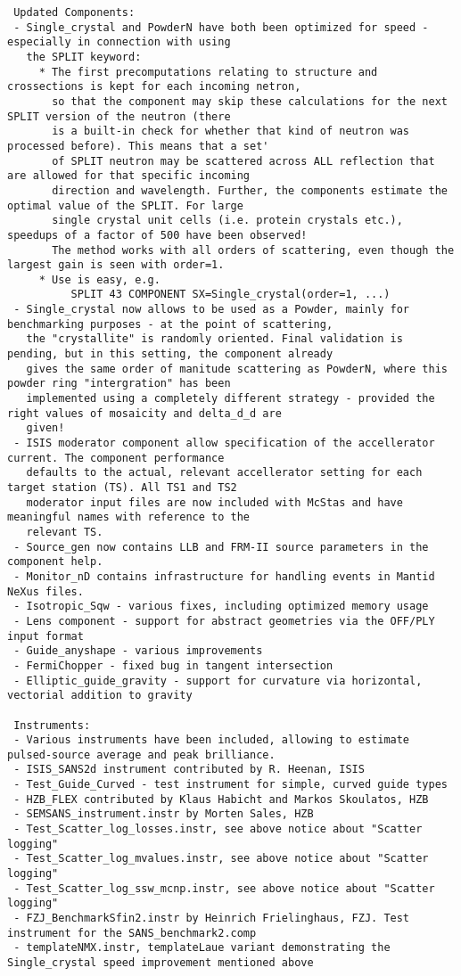 \begin{lstlisting}
 Updated Components:
 - Single_crystal and PowderN have both been optimized for speed - especially in connection with using
   the SPLIT keyword:
     * The first precomputations relating to structure and crossections is kept for each incoming netron,
       so that the component may skip these calculations for the next SPLIT version of the neutron (there
       is a built-in check for whether that kind of neutron was processed before). This means that a set'
       of SPLIT neutron may be scattered across ALL reflection that are allowed for that specific incoming
       direction and wavelength. Further, the components estimate the optimal value of the SPLIT. For large
       single crystal unit cells (i.e. protein crystals etc.), speedups of a factor of 500 have been observed!
       The method works with all orders of scattering, even though the largest gain is seen with order=1.
     * Use is easy, e.g.
          SPLIT 43 COMPONENT SX=Single_crystal(order=1, ...)
 - Single_crystal now allows to be used as a Powder, mainly for benchmarking purposes - at the point of scattering,
   the "crystallite" is randomly oriented. Final validation is pending, but in this setting, the component already
   gives the same order of manitude scattering as PowderN, where this powder ring "intergration" has been 
   implemented using a completely different strategy - provided the right values of mosaicity and delta_d_d are
   given!
 - ISIS moderator component allow specification of the accellerator current. The component performance
   defaults to the actual, relevant accellerator setting for each target station (TS). All TS1 and TS2
   moderator input files are now included with McStas and have meaningful names with reference to the 
   relevant TS. 
 - Source_gen now contains LLB and FRM-II source parameters in the component help.
 - Monitor_nD contains infrastructure for handling events in Mantid NeXus files.
 - Isotropic_Sqw - various fixes, including optimized memory usage
 - Lens component - support for abstract geometries via the OFF/PLY input format
 - Guide_anyshape - various improvements
 - FermiChopper - fixed bug in tangent intersection
 - Elliptic_guide_gravity - support for curvature via horizontal, vectorial addition to gravity

 Instruments:
 - Various instruments have been included, allowing to estimate pulsed-source average and peak brilliance.
 - ISIS_SANS2d instrument contributed by R. Heenan, ISIS
 - Test_Guide_Curved - test instrument for simple, curved guide types
 - HZB_FLEX contributed by Klaus Habicht and Markos Skoulatos, HZB
 - SEMSANS_instrument.instr by Morten Sales, HZB
 - Test_Scatter_log_losses.instr, see above notice about "Scatter logging"
 - Test_Scatter_log_mvalues.instr, see above notice about "Scatter logging"
 - Test_Scatter_log_ssw_mcnp.instr, see above notice about "Scatter logging"
 - FZJ_BenchmarkSfin2.instr by Heinrich Frielinghaus, FZJ. Test instrument for the SANS_benchmark2.comp
 - templateNMX.instr, templateLaue variant demonstrating the Single_crystal speed improvement mentioned above

\end{lstlisting}
